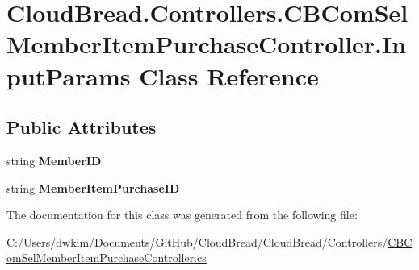 \hypertarget{class_cloud_bread_1_1_controllers_1_1_c_b_com_sel_member_item_purchase_controller_1_1_input_params}{}\section{Cloud\+Bread.\+Controllers.\+C\+B\+Com\+Sel\+Member\+Item\+Purchase\+Controller.\+Input\+Params Class Reference}
\label{class_cloud_bread_1_1_controllers_1_1_c_b_com_sel_member_item_purchase_controller_1_1_input_params}
\subsection*{Public Attributes}
\begin{DoxyCompactItemize}
\item 
string {\bfseries Member\+ID}\hypertarget{class_cloud_bread_1_1_controllers_1_1_c_b_com_sel_member_item_purchase_controller_1_1_input_params_a8297a022246657bb8b9f6e18cc64c3a7}{}\label{class_cloud_bread_1_1_controllers_1_1_c_b_com_sel_member_item_purchase_controller_1_1_input_params_a8297a022246657bb8b9f6e18cc64c3a7}

\item 
string {\bfseries Member\+Item\+Purchase\+ID}\hypertarget{class_cloud_bread_1_1_controllers_1_1_c_b_com_sel_member_item_purchase_controller_1_1_input_params_a72719255f3371469fb5fccc3c2a145d6}{}\label{class_cloud_bread_1_1_controllers_1_1_c_b_com_sel_member_item_purchase_controller_1_1_input_params_a72719255f3371469fb5fccc3c2a145d6}

\end{DoxyCompactItemize}


The documentation for this class was generated from the following file\+:\begin{DoxyCompactItemize}
\item 
C\+:/\+Users/dwkim/\+Documents/\+Git\+Hub/\+Cloud\+Bread/\+Cloud\+Bread/\+Controllers/\hyperlink{_c_b_com_sel_member_item_purchase_controller_8cs}{C\+B\+Com\+Sel\+Member\+Item\+Purchase\+Controller.\+cs}\end{DoxyCompactItemize}
